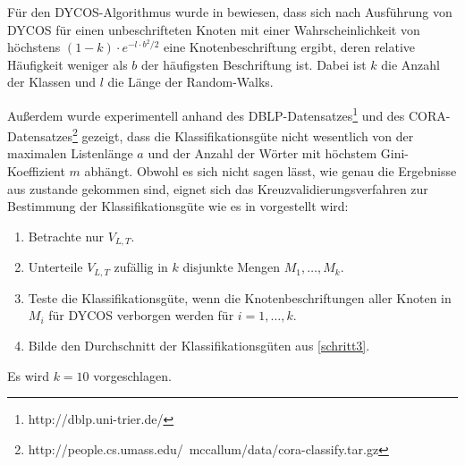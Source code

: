Für den DYCOS-Algorithmus wurde in \cite{aggarwal2011} bewiesen,
dass sich nach Ausführung von DYCOS für einen unbeschrifteten
Knoten mit einer Wahrscheinlichkeit von höchstens
$(1-k)\cdot e^{-l \cdot b^2 / 2}$ eine Knotenbeschriftung ergibt, deren
relative Häufigkeit weniger als $b$ der häufigsten Beschriftung ist.
Dabei ist $k$ die Anzahl der Klassen und $l$ die Länge der 
Random-Walks.

Außerdem wurde experimentell anhand des DBLP-Datensatzes\footnote{http://dblp.uni-trier.de/}
und des CORA-Datensatzes\footnote{http://people.cs.umass.edu/~mccallum/data/cora-classify.tar.gz}
gezeigt, dass die Klassifikationsgüte nicht wesentlich von der
maximalen Listenlänge $a$ und der Anzahl der Wörter mit
höchstem Gini-Koeffizient $m$ abhängt. Obwohl es sich nicht sagen lässt,
wie genau die Ergebnisse aus \cite{aggarwal2011} zustande gekommen sind,
eignet sich das Kreuzvalidierungsverfahren zur Bestimmung der Klassifikationsgüte
wie es in \cite{Lavesson,Stone1974} vorgestellt wird:
\begin{enumerate}
    \item Betrachte nur $V_{L,T}$.
    \item Unterteile $V_{L,T}$ zufällig in $k$ disjunkte Mengen $M_1, \dots, M_k$.
    \item \label{schritt3} Teste die Klassifikationsgüte, wenn die Knotenbeschriftungen
          aller Knoten in $M_i$ für DYCOS verborgen werden für $i=1,\dots, k$.
    \item Bilde den Durchschnitt der Klassifikationsgüten aus \cref{schritt3}.
\end{enumerate}

Es wird $k=10$ vorgeschlagen.


